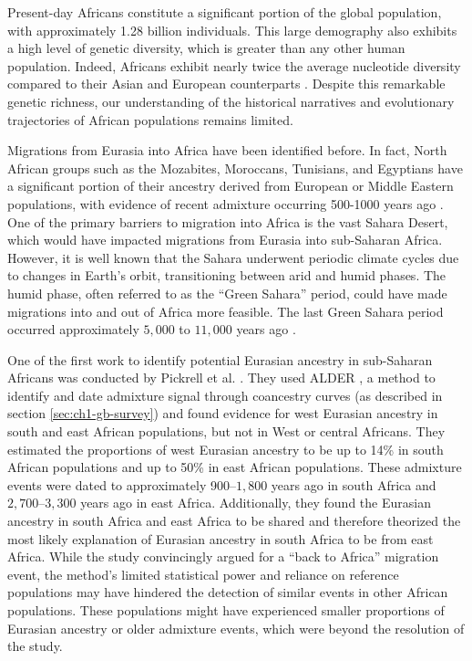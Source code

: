 Present-day Africans constitute a significant portion of the global population, with approximately 1.28 billion individuals.
%
This large demography also exhibits a high level of genetic diversity, which is greater than any other human population.
%
Indeed, Africans exhibit nearly twice the average nucleotide diversity compared to their Asian and European counterparts \cite{yu2002larger}. 
%
Despite this remarkable genetic richness, our understanding of the historical narratives and evolutionary trajectories of African populations remains limited. 


Migrations from Eurasia into Africa have been identified before. 
%
In fact, North African groups such as the Mozabites, Moroccans, Tunisians, and Egyptians have a significant portion of their ancestry derived from European or Middle Eastern populations, with evidence of recent admixture occurring 500-1000 years ago \cite{price2009sensitive, hellenthal2014genetic, salter2019fine}. 
%
One of the primary barriers to migration into Africa is the vast Sahara Desert, which would have impacted migrations from Eurasia into sub-Saharan Africa.
%
However, it is well known that the Sahara underwent periodic climate cycles due to changes in Earth's orbit, transitioning between arid and humid phases. 
%
The humid phase, often referred to as the ``Green Sahara'' period, could have made migrations into and out of Africa more feasible. The last Green Sahara period occurred approximately $5{,}000$ to $11{,}000$ years ago \cite{tierney2017rainfall, larrasoana2013dynamics}.

One of the first work to identify potential Eurasian ancestry in sub-Saharan Africans was conducted by Pickrell et al. \cite{pickrell2012genetic, pickrell2014ancient}.
%
They used ALDER \cite{loh2013inferring}, a method to identify and date admixture signal through coancestry curves (as described in section \ref{sec:ch1-gb-survey}) and found evidence for west Eurasian ancestry in south and east African populations, but not in West or central Africans. 
%
They estimated the proportions of west Eurasian ancestry to be up to 14\% in south African populations and up to 50\% in east African populations. These admixture events were dated to approximately 900–$1{,}800$ years ago in south Africa and $2{,}700$–$3{,}300$ years ago in east Africa. 
%
Additionally, they found the Eurasian ancestry in south Africa and east Africa to be shared and therefore theorized the most likely explanation of Eurasian ancestry in south Africa to be from east Africa.
%
While the study convincingly argued for a ``back to Africa'' migration event, the method's limited statistical power and reliance on reference populations may have hindered the detection of similar events in other African populations. 
%
These populations might have experienced smaller proportions of Eurasian ancestry or older admixture events, which were beyond the resolution of the study.

